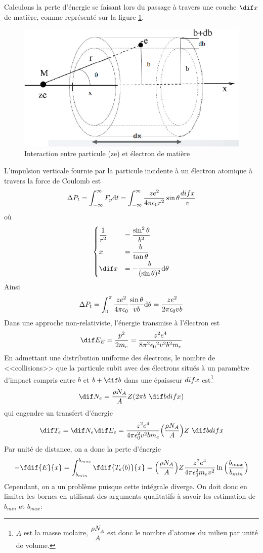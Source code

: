 Calculons la perte d'énergie se faisant lors du passage à travers une couche $\dif x$ de matière, comme représenté sur la figure \ref{fig:interraction_particule_matiere}.
\begin{figure}[ht]
    \centering
    \includegraphics[scale=0.60]{Images1/pertenrj.PNG}
    \caption{Interaction entre particule (ze) et électron de matière}
    \label{fig:interraction_particule_matiere}
\end{figure}
L'impulsion verticale fournie par la particule incidente à un électron atomique à travers la force de Coulomb est
\[
    \Delta P_t=\int_{-\infty}^\infty F_y \mathrm{d}t=\int_{-\infty}^\infty \dfrac{ze^2}{4\pi \epsilon_0 r^2} \sin{\theta}\dfrac{\\dif x}{v}
\]
où
\[\begin{cases}
    \dfrac{1}{r^2} &= \dfrac{\sin^2\theta}{b^2} \\[2mm]
    x &= \dfrac{b}{\tan{\theta}} \\[2mm]
    \dif x &= -\dfrac{b}{(\sin{\theta})^2}\d\theta
\end{cases}\]
Ainsi
\[
    \Delta P_t=\int_{0}^\pi \dfrac{ze^2}{4\pi \epsilon_0}\dfrac{\sin{\theta}}{vb}\mathrm{d}\theta = \dfrac{ze^2}{2\pi \epsilon_0 vb}
\]
Dans une approche non-relativiste, l'énergie transmise à l'électron est
\[
    \dif E_E=\dfrac{p^2}{2m_e}=\dfrac{z^2e^4}{8\pi^2{\epsilon_0}^2v^2b^2m_e}
\]
En admettant une distribution uniforme des électrons, le nombre de <<collisions>> que la particule subit avec des électrons situés à un paramètre d'impact compris entre $b$ et $b+\dif b$ dans une épaisseur $\\dif x$ est\footnote{$A$ est la masse molaire, $\dfrac{\rho N_A}{A}$ est donc le nombre d'atomes du milieu par unité de volume.}
\[
    \dif N_e=\dfrac{\rho N_A}{A}Z(2\pi b~\dif b~\\dif x)
\]
qui engendre un transfert d'énergie
\[
    \dif T_e=\dif N_e\dif E_e=\dfrac{z^2e^4}{4\pi \epsilon_0^2v^2bm_e}\Big(\dfrac{\rho N_A}{A}\Big)Z~\dif b~\\dif x
\]
Par unité de distance, on a donc la perte d'énergie
\[
    -\fdif{E}{x}=\int_{b_{min}}^{b_{max}} \fdif{T_e(b)}{x}=\Big(\dfrac{\rho N_A}{A}\Big)Z\dfrac{z^2e^4}{4\pi \epsilon_0^2m_ev^2}\ln{\Big(\dfrac{b_{max}}{b_{min}}\Big)}
\]
Cependant, on a un problème puisque cette intégrale diverge. On doit donc en limiter les bornes en utilisant des arguments qualitatifs à savoir les estimation de $b_{min}$ et $b_{max}$:

